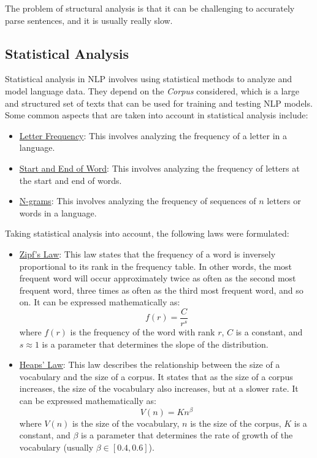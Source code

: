 The problem of structural analysis is that it can be challenging to accurately parse sentences, and it is usually really slow.

\subsection{Statistical Analysis}

Statistical analysis in NLP involves using statistical methods to analyze and model language data. They depend on the \emph{Corpus} considered, which is a large and structured set of texts that can be used for training and testing NLP models. Some common aspects that are taken into account in statistical analysis include:
\begin{itemize}
    \item \ul{Letter Frequency}: This involves analyzing the frequency of a letter in a language.
    \item \ul{Start and End of Word}: This involves analyzing the frequency of letters at the start and end of words.
    \item \ul{N-grams}: This involves analyzing the frequency of sequences of $n$ letters or words in a language.
\end{itemize}

Taking statistical analysis into account, the following laws were formulated:
\begin{itemize}
    \item \ul{Zipf's Law}: This law states that the frequency of a word is inversely proportional to its rank in the frequency table. In other words, the most frequent word will occur approximately twice as often as the second most frequent word, three times as often as the third most frequent word, and so on. It can be expressed mathematically as:
    \begin{equation}
        f(r) = \frac{C}{r^s}
    \end{equation}
    where $f(r)$ is the frequency of the word with rank $r$, $C$ is a constant, and $s\approx 1$ is a parameter that determines the slope of the distribution.

    \item \ul{Heaps' Law}: This law describes the relationship between the size of a vocabulary and the size of a corpus. It states that as the size of a corpus increases, the size of the vocabulary also increases, but at a slower rate. It can be expressed mathematically as:
    \begin{equation}
        V(n) = K n^\beta
    \end{equation}
    where $V(n)$ is the size of the vocabulary, $n$ is the size of the corpus, $K$ is a constant, and $\beta$ is a parameter that determines the rate of growth of the vocabulary (usually $\beta\in \left[0.4, 0.6\right]$).
\end{itemize}

